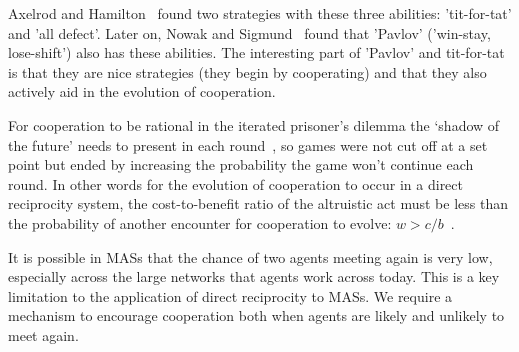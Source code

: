 \documentclass[]{final_report}
\begin{document}
Axelrod and Hamilton~\cite{evolution_of_cooperation} found two strategies with these three abilities: 'tit-for-tat' and 'all defect'. Later on, Nowak and Sigmund~\cite{nowak-1993a} found that 'Pavlov' ('win-stay, lose-shift') also has these abilities. The interesting part of 'Pavlov' and tit-for-tat is that they are nice strategies (they begin by cooperating) and that they also actively aid in the evolution of cooperation.\par
For cooperation to be rational in the iterated prisoner's dilemma the `shadow of the future' needs to present in each round~\cite{wooldridge2009introduction}, so games were not cut off at a set point but ended by increasing the probability the game won't continue each round. In other words for the evolution of cooperation to occur in a direct reciprocity system, the cost-to-benefit ratio of the altruistic act must be less than the probability of another encounter for cooperation to evolve: $w>c/b$~\cite{five_rules_coop}.\par 
It is possible in MASs that the chance of two agents meeting again is very low, especially across the large networks that agents work across today. This is a key limitation to the application of direct reciprocity to MASs. We require a mechanism to encourage cooperation both when agents are likely and unlikely to meet again.
\end{document}
